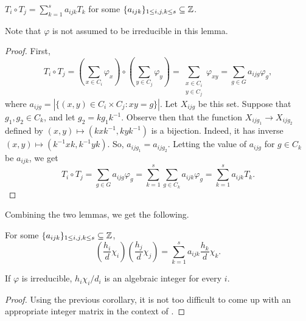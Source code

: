 		\begin{flem}
			$T_i \circ T_j = \sum_{k=1}^s a_{ijk} T_k$ for some $\{a_{ijk}\}_{1\le i,j,k\le s} \subseteq \mathbb{Z}$.
		\end{flem}
		Note that $\varphi$ is not assumed to be irreducible in this lemma.
		\begin{proof}
			First,
			\[ T_i \circ T_j = \left(\sum_{x \in C_i} \varphi_x\right) \circ \left(\sum_{y \in C_j} \varphi_y\right) = \sum_{\substack{x \in C_i \\ y \in C_j}} \varphi_{xy} = \sum_{g \in G} a_{ijg} \varphi_g, \]
			where $a_{ijg} = |\{(x,y) \in C_i \times C_j : xy = g\}|$. Let $X_{ijg}$ be this set. Suppose that $g_1,g_2 \in C_k$, and let $g_2 = kg_1k^{-1}$. Observe then that the function $X_{ijg_1} \to X_{ijg_2}$ defined by $(x,y) \mapsto (kxk^{-1},kyk^{-1})$ is a bijection. Indeed, it has inverse $(x,y) \mapsto (k^{-1}xk,k^{-1}yk)$. So, $a_{ijg_1} = a_{ijg_2}$. Letting the value of $a_{ijg}$ for $g \in C_k$ be $a_{ijk}$, we get
			\[ T_i \circ T_j = \sum_{g \in G} a_{ijg} \varphi_g = \sum_{k=1}^s \sum_{g \in C_k} a_{ijk} \varphi_g = \sum_{k=1}^s a_{ijk} T_k. \]
		\end{proof}

		Combining the two lemmas, we get the following.

		\begin{fcor}
			For some $\{a_{ijk}\}_{1\le i,j,k\le s} \subseteq \mathbb{Z}$,
			\[ \left( \frac{h_i}{d} \chi_i \right) \left( \frac{h_j}{d} \chi_j \right) = \sum_{k=1}^s a_{ijk} \frac{h_k}{d} \chi_k. \]
		\end{fcor}

		\begin{flem}
			\label{lemma: hi chii di alg int}
			If $\varphi$ is irreducible, $h_i \chi_i/d_i$ is an algebraic integer for every $i$.
		\end{flem}
		\begin{proof}
			Using the previous corollary, it is not too difficult to come up with an appropriate integer matrix in the context of .
		\end{proof}

